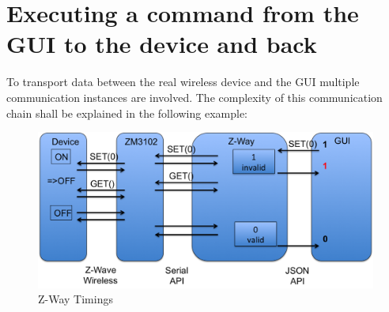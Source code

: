 \section{Executing a command from the GUI to the device and back}

To transport data between the real wireless device and the GUI multiple communication instances are involved. The complexity of this communication chain shall be 
explained in the following example:

\begin{figure} 
\begin{center}
\includegraphics[scale=0.6]{pics/zway2en.png}
\caption{Z-Way Timings}
\label{zwaytimings} 
\end{center} 
\end{figure}

